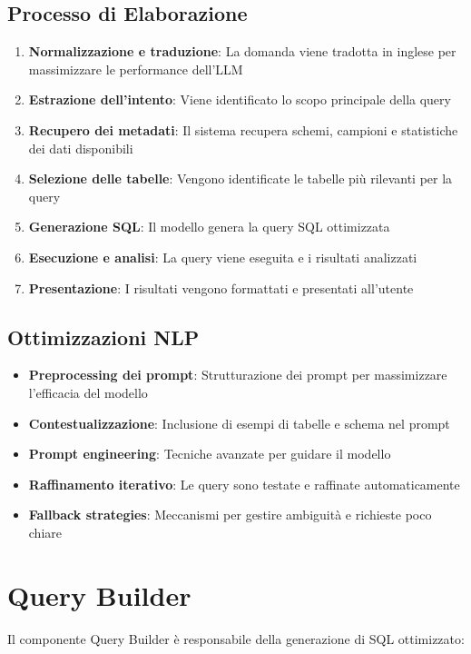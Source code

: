 \documentclass[11pt,a4paper,twoside]{report}
\begin{document}
\subsection{Processo di Elaborazione}
\begin{enumerate}
    \item \textbf{Normalizzazione e traduzione}: La domanda viene tradotta in inglese per massimizzare le performance dell'LLM
    \item \textbf{Estrazione dell'intento}: Viene identificato lo scopo principale della query
    \item \textbf{Recupero dei metadati}: Il sistema recupera schemi, campioni e statistiche dei dati disponibili
    \item \textbf{Selezione delle tabelle}: Vengono identificate le tabelle più rilevanti per la query
    \item \textbf{Generazione SQL}: Il modello genera la query SQL ottimizzata
    \item \textbf{Esecuzione e analisi}: La query viene eseguita e i risultati analizzati
    \item \textbf{Presentazione}: I risultati vengono formattati e presentati all'utente
\end{enumerate}

\subsection{Ottimizzazioni NLP}
\begin{itemize}
    \item \textbf{Preprocessing dei prompt}: Strutturazione dei prompt per massimizzare l'efficacia del modello
    \item \textbf{Contestualizzazione}: Inclusione di esempi di tabelle e schema nel prompt
    \item \textbf{Prompt engineering}: Tecniche avanzate per guidare il modello
    \item \textbf{Raffinamento iterativo}: Le query sono testate e raffinate automaticamente
    \item \textbf{Fallback strategies}: Meccanismi per gestire ambiguità e richieste poco chiare
\end{itemize}

\section{Query Builder}
Il componente Query Builder è responsabile della generazione di SQL ottimizzato:
\end{document}
